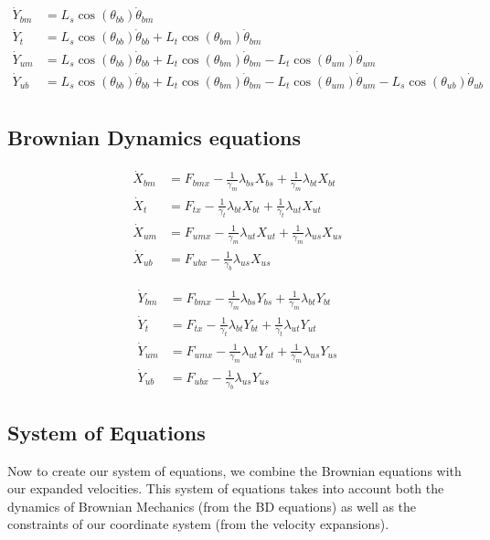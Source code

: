 \documentclass[11pt,twocolumn]{article}
\newcommand{\gb}{\frac{1}{\gamma_b}}
\newcommand{\gm}{\frac{1}{\gamma_m}}
\newcommand{\gt}{\frac{1}{\gamma_t}}
\begin{document}
\begin{align*}
\dot{Y}_{bm} &= L_s\cos(\theta_{bb})\dot{\theta}_{bm}\\
\dot{Y}_{t } &= L_s\cos(\theta_{bb})\dot{\theta}_{bb} + L_t\cos(\theta_{bm})\dot{\theta}_{bm}\\
\dot{Y}_{um} &= L_s\cos(\theta_{bb})\dot{\theta}_{bb} + L_t\cos(\theta_{bm})\dot{\theta}_{bm} - L_t\cos(\theta_{um})\dot{\theta}_{um}\\
\dot{Y}_{ub} &= L_s\cos(\theta_{bb})\dot{\theta}_{bb} + L_t\cos(\theta_{bm})\dot{\theta}_{bm} - L_t\cos(\theta_{um})\dot{\theta}_{um} - L_s\cos(\theta_{ub})\dot{\theta}_{ub}\\
\end{align*}

\subsection{Brownian Dynamics equations}
\begin{align*}
  \dot{X}_{bm} &= F_{bmx} - \gm\lambda_{bs}X_{bs} + \gm\lambda_{bt}X_{bt}\\
  \dot{X}_{t}  &= F_{tx}  - \gt\lambda_{bt}X_{bt} + \gt\lambda_{ut}X_{ut}\\
  \dot{X}_{um} &= F_{umx} - \gm\lambda_{ut}X_{ut} + \gm\lambda_{us}X_{us}\\
  \dot{X}_{ub} &= F_{ubx} - \gb\lambda_{us}X_{us}
\end{align*}

\begin{align*}
  \dot{Y}_{bm} &= F_{bmx} - \gm\lambda_{bs}Y_{bs} + \gm\lambda_{bt}Y_{bt}\\
  \dot{Y}_{t}  &= F_{tx}  - \gt\lambda_{bt}Y_{bt} + \gt\lambda_{ut}Y_{ut}\\
  \dot{Y}_{um} &= F_{umx} - \gm\lambda_{ut}Y_{ut} + \gm\lambda_{us}Y_{us}\\
  \dot{Y}_{ub} &= F_{ubx} - \gb\lambda_{us}Y_{us}
\end{align*}

\subsection{System of Equations}
Now to create our system of equations, we combine the Brownian equations with our expanded velocities. This system of equations takes into account both the dynamics of Brownian Mechanics (from the BD equations) as well as the constraints of our coordinate system (from the velocity expansions).
\end{document}
